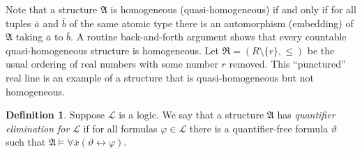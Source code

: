 \documentclass{ndjflart}
\theoremstyle{plain}
\theoremstyle{definition}
\newtheorem{definition}[conjecture]{Definition}
\numberwithin{equation}{section}
\begin{document}
Note that a structure $\mathfrak{A}$ is homogeneous (quasi-homogeneous) if and only if for all tuples $\overline{a}$ and $\overline{b}$ of the same atomic type there is an automorphism (embedding) of $\mathfrak{A}$ taking $\overline{a}$ to $\overline{b}$.
A routine back-and-forth argument shows that
every countable quasi-homogeneous structure is homogeneous.
Let $\mathfrak{R} = (R\setminus\{r\},\leq)$ be the usual ordering of real numbers with some number $r$ removed.
This ``punctured'' real line is an example of a structure that is quasi-homogeneous but not homogeneous.

\begin{definition}
Suppose $\mathcal{L}$ is a logic.
We say that a structure $\mathfrak{A}$ has \emph{quantifier elimination for} $\mathcal{L}$ if for all formulas $\varphi \in \mathcal{L}$ there is a quantifier-free formula $\vartheta$ such that $\mathfrak{A} \vDash \forall \overline{x}(\vartheta \leftrightarrow \varphi)$.
\end{definition}
\end{document}
